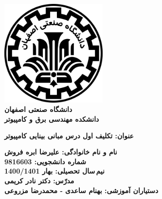\begin{titlepage}
\begin{center}
\includegraphics[width=0.4\textwidth]{figures/IUT Logo.png}\\
        
\LARGE
\textbf{دانشگاه صنعتی اصفهان}\\
\textbf{دانشکده مهندسی برق و کامپیوتر}\\
        
\vfill
        
\huge
\textbf{عنوان: تکلیف اول درس مبانی بینایی کامپیوتر}\\
        
\vfill
        
\LARGE
\textbf{نام و نام خانوادگی: علیرضا ابره فروش}\\
\textbf{شماره دانشجویی: 9816603}\\
\textbf{نیم\,سال تحصیلی: بهار 1400/1401}\\
\textbf{مدرّس: دکتر نادر کریمی}\\
\textbf{دستیاران آموزشی: بهنام ساعدی - محمدرضا مزروعی}\\
\end{center}
\end{titlepage}
